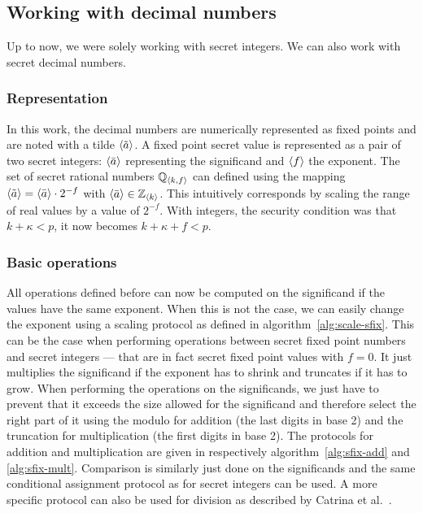 \subsection{Working with decimal numbers}
Up to now, we were solely working with secret integers. We can also work with secret decimal numbers. 

\subsubsection{Representation} 
In this work, the decimal numbers are numerically represented as fixed points and are noted with a tilde $\langle \tilde{a} \rangle$. A fixed point secret value is represented as a pair of two secret integers: $\langle \bar{a} \rangle$ representing the significand and $\langle f \rangle$ the exponent. The set of secret rational numbers $\mathbb{Q}_{\langle k,f \rangle}$ can defined using the mapping $\langle \tilde{a} \rangle = \langle \bar{a} \rangle\cdot 2^{-f}$ with $\langle \bar{a} \rangle \in \mathbb{Z}_{\langle k \rangle}$. This intuitively corresponds by scaling the range of real values by a value of $2^{-f}$. With integers, the security condition was that $k+\kappa < p$, it now becomes $k+\kappa+f<p$.

\subsubsection{Basic operations}
All operations defined before can now be computed on the significand if the values have the same exponent. When this is not the case, we can easily change the exponent using a scaling protocol as defined in algorithm~\ref{alg:scale-sfix}. This can be the case when performing operations between secret fixed point numbers and secret integers --- that are in fact secret fixed point values with $f=0$. It just multiplies the significand if the exponent has to shrink and truncates if it has to grow. When performing the operations on the significands, we just have to prevent that it exceeds the size allowed for the significand and therefore select the right part of it using the modulo for addition (the last digits in base 2) and the truncation for multiplication (the first digits in base 2). The protocols for addition and multiplication are given in respectively algorithm~\ref{alg:sfix-add} and \ref{alg:sfix-mult}. Comparison is similarly just done on the significands and the same conditional assignment protocol as for secret integers can be used. A more specific protocol can also be used for division as described by Catrina et al.~\cite{Catrina2010SecureNumbers}.

